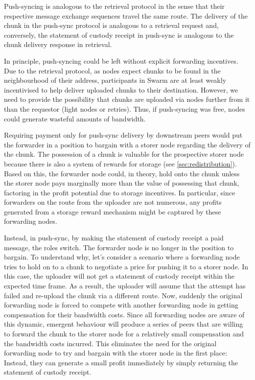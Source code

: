 Push-syncing is analogous to the retrieval protocol in the sense that their respective message exchange sequences travel the same route.
The delivery of the chunk in the push-sync protocol is analogous to a retrieval request and, conversely, the statement of custody receipt in push-sync is analogous to the chunk delivery response in retrieval.

In principle, push-syncing could be left without explicit forwarding incentives. Due to the retrieval protocol, as nodes expect chunks to be found in the neighbourhood of their address, participants in Swarm are at least weakly incentivised to help deliver uploaded chunks to their destination. However, we  need to provide the possibility that chunks are uploaded via nodes further from it than the requestor (light  nodes or retries). Thus, if push-syncing was free, nodes could generate wasteful amounts of bandwidth. 

Requiring payment only for push-sync delivery by downstream peers would put the forwarder in a position to bargain with a storer node regarding the delivery of the chunk. The possession of a chunk is valuable for the prospective storer node because there is also a system of rewards for storage (see \ref{sec:redistribution}). Based on this, the forwarder node could, in theory, hold onto the chunk unless the storer node pays marginally more than the value of possessing that chunk, factoring in the profit potential due to storage incentives. In particular, since forwarders on the route from the uploader are not numerous, any profits generated from a storage reward mechanism might be captured by these forwarding nodes.

Instead, in push-sync, by making the statement of custody receipt a paid message, the roles switch. The forwarder node is no longer in the position to bargain. To understand why, let's consider a scenario where a forwarding node tries to hold on to a chunk to negotiate a price for pushing it to a storer node. In this case, the uploader will not get a statement of custody receipt within the expected time frame. As a result, the uploader will assume that the attempt has failed and re-upload the chunk via a different route. Now, suddenly the original forwarding node is forced to compete with another forwarding node in getting compensation for their bandwidth costs. Since all forwarding nodes are aware of this dynamic, emergent behaviour will produce a series of peers that are willing to forward the chunk to the storer node for a relatively small compensation and the bandwidth costs incurred. This eliminates the need for the original forwarding node to try and bargain with the storer node in the first place: Instead, they can generate a small profit immediately by simply returning the statement of custody receipt. 


